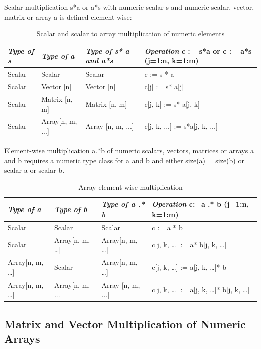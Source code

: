 \documentclass[10pt,a4paper]{report}
\def\doublelabel#1{\label{#1}}
\begin{document}
Scalar multiplication s*a or a*s with numeric scalar s and numeric
scalar, vector, matrix or array a is defined element-wise:

\begin{longtable}[]{|l|l|l|l|}
\caption{Scalar and scalar to array multiplication of numeric elements}\\
\hline
\emph{Type of s} & \emph{Type of a} & \emph{Type of s* a and a*s} &
\emph{Operation} c := s*a or c := a*s (j=1:n, k=1:m)\\ \hline
\endhead
Scalar & Scalar & Scalar & c := s * a\\ \hline
Scalar & Vector {[}n{]} & Vector {[}n{]} & c{[}j{]} := s*
a{[}j{]}\\ \hline
Scalar & Matrix {[}n, m{]} & Matrix {[}n, m{]} & c{[}j, k{]} := s*
a{[}j, k{]}\\ \hline
Scalar & Array{[}n, m, ...{]} & Array {[}n, m, ...{]} & c{[}j, k, ...{]}
:= s*a{[}j, k, ...{]}\\ \hline
\end{longtable}

Element-wise multiplication a.*b of numeric scalars, vectors, matrices
or arrays a and b requires a numeric type class for a and b and either
size(a) = size(b) or scalar a or scalar b.

\begin{longtable}[]{|l|l|l|l|}
\caption{Array element-wise multiplication}\\
\hline
\emph{Type of a} & \emph{Type of b} & \emph{Type of a .* b} &
\emph{Operation} c:=a .* b (j=1:n, k=1:m)\\ \hline
\endhead
Scalar & Scalar & Scalar & c := a * b\\ \hline
Scalar & Array{[}n, m, \ldots{}{]} & Array{[}n, m, \ldots{}{]} & c{[}j,
k, \ldots{}{]} := a* b{[}j, k, \ldots{}{]}\\ \hline
Array{[}n, m, \ldots{}{]} & Scalar & Array{[}n, m, \ldots{}{]} & c{[}j,
k, \ldots{}{]} := a{[}j, k, \ldots{}{]}* b\\ \hline
Array{[}n, m, \ldots{}{]} & Array{[}n, m, ...{]} & Array {[}n, m, ...{]}
& c{[}j, k, \ldots{}{]} := a{[}j, k, \ldots{}{]}* b{[}j, k,
\ldots{}{]}\\ \hline
\end{longtable}

\subsection{Matrix and Vector Multiplication of Numeric Arrays}\doublelabel{matrix-and-vector-multiplication-of-numeric-arrays}
\end{document}
